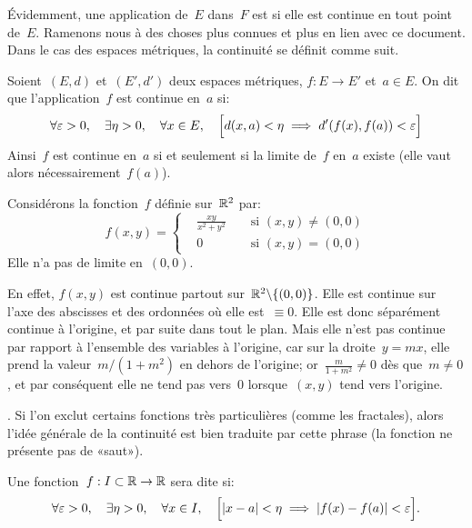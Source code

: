 \medskip
Évidemment, une application de~$E$ dans~$F$ est  si elle est continue en tout point de~$E$.
\medskipvm
Ramenons nous à des choses plus connues et plus en lien avec ce document.
Dans le cas des espaces métriques, la continuité se définit comme suit.

\begin{definition}
Soient~$(E,d)$ et~$(E',d')$ deux espaces métriques, $f: E \to E'$ et~$a \in E$.
On dit que l'application~$f$ est continue en~$a$ si:
\begin{equation}
  \forall \varepsilon > 0, \quad \exists \eta > 0, \quad \forall x \in E, \quad \Bigl[d(x,a)<\eta \implies d'(f(x),f(a))<\varepsilon\Bigr]
\end{equation}
Ainsi~$f$ est continue en~$a$ si et seulement si la limite de~$f$ en~$a$ existe (elle vaut alors nécessairement~$f(a)$).
\end{definition}

\medskip
Considérons la fonction~$f$ définie sur~$\mathbb R^2$ par:
\begin{equation}
  f(x,y)=\left\{\begin{aligned}&\frac{xy}{x^2+y^2}&&\text{ si } (x,y)\neq(0,0) \\
&0&&\text{ si } (x,y)=(0,0) \end{aligned}\right.
\end{equation}
Elle n'a pas de limite en~$(0,0)$.

\small
En effet, $f(x,y)$ est continue partout sur~$\mathbb R^2\backslash\{(0,0)\}$. Elle est continue sur l'axe des abscisses et des ordonnées où elle est~$\equiv0$. Elle est donc séparément continue à l'origine, et par suite dans tout le plan. Mais elle n'est pas continue par rapport à l'ensemble des variables à l'origine, car sur la droite~$y=mx$, elle prend la valeur~$m/(1+m^2)$ en dehors de l'origine; or~$\frac{m}{1+m^2}\ne0$ dès que~$m\ne0$, et par conséquent elle ne tend pas vers~$0$ lorsque~$(x,y)$ tend vers l'origine.
\normalsize

\medskip
{}. Si l'on exclut certains fonctions très particulières (comme les fractales), alors l'idée générale de la continuité est bien traduite par cette phrase (la fonction ne présente pas de «saut»).

\medskip
\begin{definition}
Une fonction~$f: I\subset\mathbb R \to \mathbb R$ sera dite  si:
\begin{equation}
  \forall \varepsilon > 0, \quad \exists \eta > 0, \quad \forall x \in I, \quad \Bigl[|x - a| <\eta \implies |f(x) - f(a)|<\varepsilon\Bigr].
\end{equation}
\end{definition}

